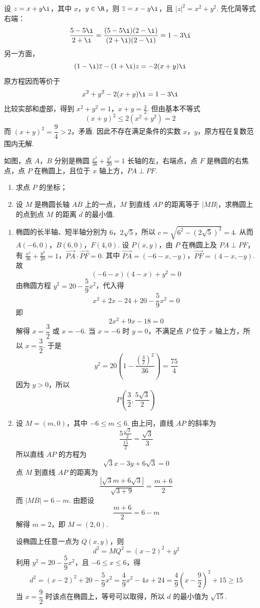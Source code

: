 \begin{solution}
设 \(z=x+y\i\)，其中 \(x\)，\(y\in\R\)，则 \(\overline{z}=x-y\i\)，且 \(|z|^2=x^2+y^2\). 先化简等式右端：
\[
\frac{5-5\i}{2+\i}=\frac{(5-5\i)(2-\i)}{(2+\i)(2-\i)}=1-3\i
\]
另一方面，
\[
(1-\i)\overline{z}-(1+\i)z=-2(x+y)\i
\]
原方程因而等价于
\[
x^2+y^2-2(x+y)\i=1-3\i
\]
比较实部和虚部，得到 \(x^2+y^2=1\)，\(x+y=\frac{3}{2}\).
但由基本不等式
\[
(x+y)^2\leqslant 2(x^2+y^2)=2
\]
而 \((x+y)^2=\dfrac{9}{4}>2\)，矛盾. 因此不存在满足条件的实数 \(x\)，\(y\)，原方程在复数范围内无解.
\end{solution}

\begin{problem}
如图，点 \(A\)，\(B\) 分别是椭圆 \( \frac{x^{2}}{36} + \frac{y^{2}}{20} = 1 \) 长轴的左，右端点，点 \(F\) 是椭圆的右焦点，点 \(P\) 在椭圆上，且位于 \(x\) 轴上方，\(PA \perp PF\).

\begin{enumerate}
\item 求点 \(P\) 的坐标；
\item 设 \(M\) 是椭圆长轴 \(AB\) 上的一点，\(M\) 到直线 \(AP\) 的距离等于 \(|MB|\)，求椭圆上的点到点 \(M\) 的距离 \(d\) 的最小值.
\end{enumerate}

\end{problem}

\begin{solution}
\begin{enumerate}
\item 椭圆的长半轴、短半轴分别为 \(6\)，\(2\sqrt{5}\)，所以 \(c=\sqrt{6^2-(2\sqrt{5})^2}=4\). 从而 \(A(-6,0)\)，\(B(6,0)\)，\(F(4,0)\). 设 \(P(x,y)\)，由 \(P\) 在椭圆上及 \(PA\perp PF\)，有 \(\frac{x^2}{36}+\frac{y^2}{20}=1\)，\(\overrightarrow{PA}\cdot\overrightarrow{PF}=0\). 其中 \(\overrightarrow{PA}=(-6-x,-y)\)，\(\overrightarrow{PF}=(4-x,-y)\).
故
\[
(-6-x)(4-x)+y^2=0
\]
由椭圆方程 \(y^2=20-\dfrac{5}{9}x^2\)，代入得
\[
x^2+2x-24+20-\frac{5}{9}x^2=0
\]
即
\[
2x^2+9x-18=0
\]
解得 \(x=\dfrac{3}{2}\) 或 \(x=-6\). 当 \(x=-6\) 时 \(y=0\)，不满足点 \(P\) 位于 \(x\) 轴上方，所以 \(x=\dfrac{3}{2}\). 于是
\[
y^2=20\left(1-\frac{(\frac{3}{2})^2}{36}\right)=\frac{75}{4}
\]
因为 \(y>0\)，所以
\[
P\left(\frac{3}{2},\frac{5\sqrt{3}}{2}\right)
\]

\item 设 \(M=(m,0)\)，其中 \(-6\leqslant m\leqslant6\). 由上问，直线 \(AP\) 的斜率为
\[
\frac{5\frac{\sqrt{3}}{2}}{\frac{15}{2}}=\frac{\sqrt{3}}{3}
\]
所以直线 \(AP\) 的方程为
\[
\sqrt{3}x-3y+6\sqrt{3}=0
\]
点 \(M\) 到直线 \(AP\) 的距离为
\[
\frac{|\sqrt{3}m+6\sqrt{3}|}{\sqrt{3+9}}=\frac{m+6}{2}
\]
而 \(|MB|=6-m\). 由题设
\[
\frac{m+6}{2}=6-m
\]
解得 \(m=2\)，即 \(M=(2,0)\).

设椭圆上任意一点为 \(Q(x,y)\)，则
\[
d^2=MQ^2=(x-2)^2+y^2
\]
利用 \(y^2=20-\dfrac{5}{9}x^2\)，且 \(-6\leqslant x\leqslant6\)，得
\[
d^2=(x-2)^2+20-\frac{5}{9}x^2
=\frac{4}{9}x^2-4x+24
=\frac{4}{9}\left(x-\frac{9}{2}\right)^2+15\geqslant15
\]
当 \(x=\dfrac{9}{2}\) 时该点在椭圆上，等号可以取得，所以 \(d\) 的最小值为 \(\sqrt{15}\).
\end{enumerate}
\end{solution}

